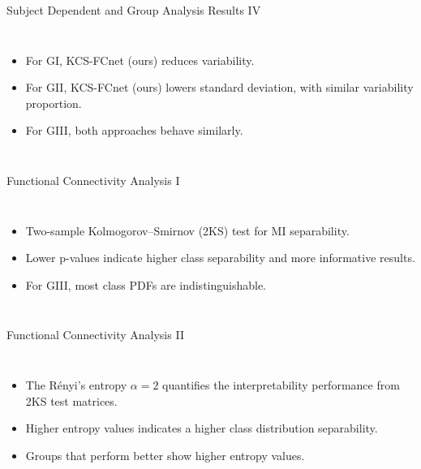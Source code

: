 \documentclass[aspectratio=169]{beamer}
\begin{document}
\begin{frame}{Subject Dependent and Group Analysis Results IV}
    \begin{columns}
            \centering
            \resizebox{1\linewidth}{!}{}
        \begin{itemize}
            \item For GI, KCS-FCnet (ours) reduces variability.
            \item For GII, KCS-FCnet (ours) lowers standard deviation, with similar variability proportion.
            \item For GIII, both approaches behave similarly.
        \end{itemize}
    \end{columns}
\end{frame}


\begin{frame}{Functional Connectivity Analysis I}
    \begin{columns}
            \begin{itemize}
                \item Two-sample Kolmogorov–Smirnov (2KS) test for MI separability.
                \item Lower p-values indicate higher class separability and more informative results.
                \item For GIII, most class PDFs are indistinguishable.
            \end{itemize}
            \centering
            \resizebox{0.8\linewidth}{!}{}
    \end{columns}
\end{frame}

\begin{frame}{Functional Connectivity Analysis II}
    \begin{columns}
            \centering
            \resizebox{1\linewidth}{!}{}
            \begin{itemize}
                \item The Rényi's entropy $\alpha=2$ quantifies the interpretability performance from 2KS test matrices.
                \item Higher entropy values indicates a higher class distribution separability. 
                \item Groups that perform better show higher entropy values.
            \end{itemize}
    \end{columns}   
\end{frame}
\end{document}
